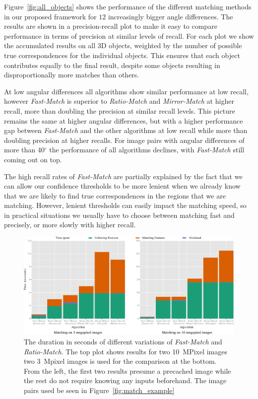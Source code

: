 \documentclass[runningheads]{llncs}
\begin{document}
Figure~\ref{fig:all_objects} shows the performance of the different matching methods in our proposed framework for $12$ increasingly bigger angle differences. The results are shown in a precision-recall plot to make it easy to compare performance in terms of precision at similar levels of recall.  For each plot we show the accumulated results on all 3D objects, weighted by the number of possible true correspondences for the individual objects. This ensures that each object contributes equally to the final result, despite some objects resulting in disproportionally more matches than others.

At low angular differences all algorithms show similar performance at low recall, however \emph{Fast-Match} is superior to \emph{Ratio-Match} and \emph{Mirror-Match} at higher recall, more than doubling the precision at similar recall levels. This picture remains the same at higher angular differences, but with a higher performance gap between \emph{Fast-Match} and the other algorithms at low recall while more than doubling precision at higher recalls. For image pairs with angular differences of more than 40$^{\circ}$ the performance of all algorithms declines, with \emph{Fast-Match} still coming out on top. 

The high recall rates of \emph{Fast-Match} are partially explained by the fact that we can allow our confidence thresholds to be more lenient when we already know that we are likely to find true correspondences in the regions that we are matching. However, lenient thresholds can easily impact the matching speed, so in practical situations we usually have to choose between matching fast and precisely, or more slowly with higher recall. 

\begin{figure}[tb]
    \centering
    \includegraphics[width=1\columnwidth]{images/timings}
    \caption{The duration in seconds of different variations of \emph{Fast-Match} and \emph{Ratio-Match}. The top plot shows results for two 10~MPixel images two 3~Mpixel images is used for the comparison at the bottom. From the left, the first two results presume a precached image while the rest do not require knowing any inputs beforehand. The image pairs used be seen in Figure~\ref{fig:match_example}}
    \label{fig:timings}
\end{figure}
\end{document}
